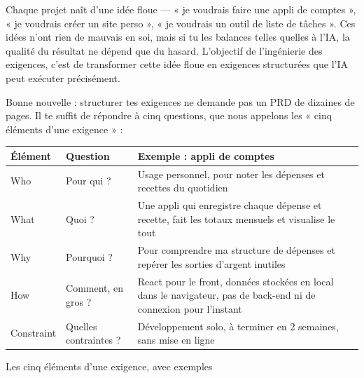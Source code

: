 


Chaque projet naît d'une idée floue — « je voudrais faire une appli de comptes », « je voudrais créer un site perso », « je voudrais un outil de liste de tâches ». Ces idées n'ont rien de mauvais en soi, mais si tu les balances telles quelles à l'IA, la qualité du résultat ne dépend que du hasard. L'objectif de l'ingénierie des exigences, c'est de transformer cette idée floue en exigences structurées que l'IA peut exécuter précisément.

Bonne nouvelle : structurer tes exigences ne demande pas un PRD de dizaines de pages. Il te suffit de répondre à cinq questions, que nous appelons les « cinq éléments d'une exigence » :

\begin{center}
\begin{tabularx}{\linewidth}{|X|X|X|}
\hline
\textbf{Élément} & \textbf{Question} & \textbf{Exemple : appli de comptes} \tabularnewline
\hline
Who & Pour qui ? & Usage personnel, pour noter les dépenses et recettes du quotidien \tabularnewline
What & Quoi ? & Une appli qui enregistre chaque dépense et recette, fait les totaux mensuels et visualise le tout \tabularnewline
Why & Pourquoi ? & Pour comprendre ma structure de dépenses et repérer les sorties d'argent inutiles \tabularnewline
How & Comment, en gros ? & React pour le front, données stockées en local dans le navigateur, pas de back-end ni de connexion pour l'instant \tabularnewline
Constraint & Quelles contraintes ? & Développement solo, à terminer en 2 semaines, sans mise en ligne \tabularnewline
\hline
\end{tabularx}
\end{center}

\begin{center}\small\color{gray}Les cinq éléments d'une exigence, avec exemples\end{center}

